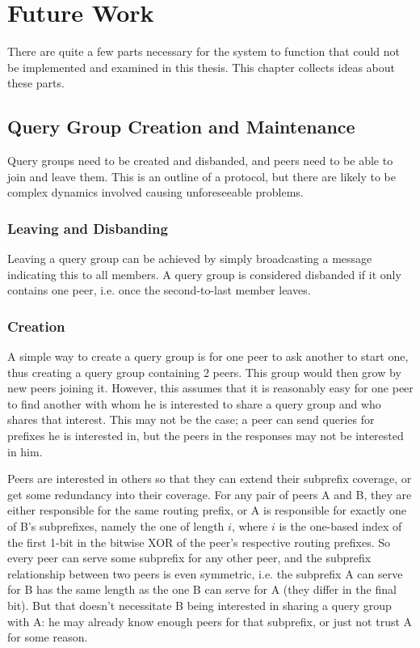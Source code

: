 \chapter{Future Work}
\label{chap:future_work}
There are quite a few parts necessary for the system to function that could not
be implemented and examined in this thesis. This chapter collects ideas about
these parts.

\section{Query Group Creation and Maintenance}
Query groups need to be created and disbanded, and peers need to be able to join
and leave them. This is an outline of a protocol, but there are likely to be
complex dynamics involved causing unforeseeable problems.

\subsection{Leaving and Disbanding}
Leaving a query group can be achieved by simply broadcasting a message
indicating this to all members. A query group is considered disbanded if it only
contains one peer, i.e. once the second-to-last member leaves.

\subsection{Creation}
A simple way to create a query group is for one peer to ask another to start
one, thus creating a query group containing 2 peers. This group would then grow
by new peers joining it. However, this assumes that it is reasonably easy for
one peer to find another with whom he is interested to share a query group and
who shares that interest. This may not be the case; a peer can send queries for
prefixes he is interested in, but the peers in the responses may not be
interested in him.

Peers are interested in others so that they can extend their subprefix coverage,
or get some redundancy into their coverage. For any pair of peers A and B, they
are either responsible for the same routing prefix, or A is responsible for
exactly one of B's subprefixes, namely the one of length $i$, where $i$ is the
one-based index of the first 1-bit in the bitwise XOR of the peer's respective
routing prefixes. So every peer can serve some subprefix for any other peer, and
the subprefix relationship between two peers is even symmetric, i.e. the
subprefix A can serve for B has the same length as the one B can serve for A
(they differ in the final bit). But that doesn't necessitate B being interested
in sharing a query group with A: he may already know enough peers for that
subprefix, or just not trust A for some reason.

